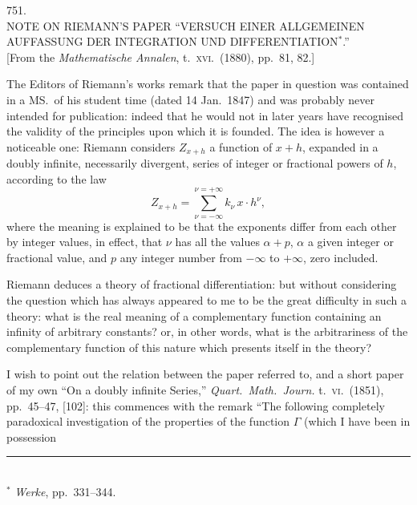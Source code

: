 \documentclass[11pt,a4paper]{article}
\begin{document}
\bigskip

\begin{center}
\textsc{751.}\\[6pt]
\textsc{NOTE ON RIEMANN'S PAPER ``VERSUCH EINER ALLGEMEINEN
AUFFASSUNG DER INTEGRATION UND DIFFERENTIATION$^{*}$.''}\\[6pt]
[From the \emph{Mathematische Annalen}, t.\ \textsc{xvi}.\ (1880),
pp.\ 81, 82.]
\end{center}

\bigskip

\noindent
The Editors of Riemann's works remark that the paper in question was
contained in a MS.\ of his student time (dated 14 Jan.\ 1847) and was
probably never intended for publication: indeed that he would not in later
years have recognised the validity of the principles upon which it is
founded.  The idea is however a noticeable one: Riemann considers $Z_{x+h}$
a function of $x + h$, expanded in a doubly infinite, necessarily divergent,
series of integer or fractional powers of $h$, according to the law
\[
  Z_{x+h} = \sum_{\nu = -\infty}^{\nu = +\infty} k_{\nu}\, x \cdot h^{\nu},
  \tag{2}
\]
where the meaning is explained to be that the exponents differ from each
other by integer values, in effect, that $\nu$ has all the values $\alpha + p$,
$\alpha$ a given integer or fractional value, and $p$ any integer number from
$-\infty$ to $+\infty$, zero included.

Riemann deduces a theory of fractional differentiation: but without
considering the question which has always appeared to me to be the great
difficulty in such a theory: what is the real meaning of a complementary
function containing an infinity of arbitrary constants? or, in other words,
what is the arbitrariness of the complementary function of this nature which
presents itself in the theory?

I wish to point out the relation between the paper referred to, and a short
paper of my own ``On a doubly infinite Series,'' \emph{Quart.\ Math.\ Journ.}
t.\ \textsc{vi}.\ (1851), pp.\ 45--47, [102]: this commences with the remark
``The following completely paradoxical investigation of the properties of the
function $\Gamma$ (which I have been in possession

\vspace{1em}
\noindent\rule{0.25\textwidth}{0.4pt}\\
{\footnotesize $^{*}$ \emph{Werke}, pp.\ 331--344.}
\end{document}
